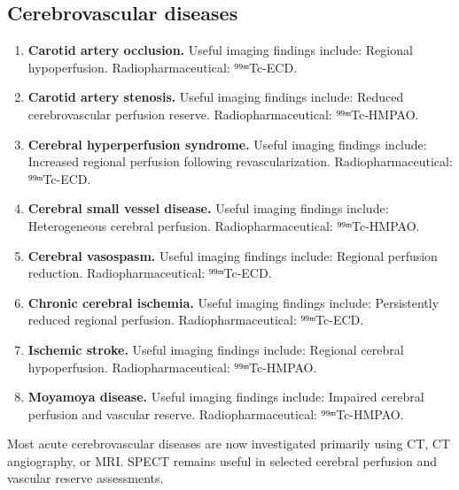 \subsection{Cerebrovascular diseases}
\begin{enumerate}[leftmargin=*,itemsep=0.45em,topsep=0.4em]
\item \textbf{Carotid artery occlusion.} Useful imaging findings include: Regional hypoperfusion. Radiopharmaceutical: ⁹⁹ᵐTc-ECD.
\item \textbf{Carotid artery stenosis.} Useful imaging findings include: Reduced cerebrovascular perfusion reserve. Radiopharmaceutical: ⁹⁹ᵐTc-HMPAO.
\item \textbf{Cerebral hyperperfusion syndrome.} Useful imaging findings include: Increased regional perfusion following revascularization. Radiopharmaceutical: ⁹⁹ᵐTc-ECD.
\item \textbf{Cerebral small vessel disease.} Useful imaging findings include: Heterogeneous cerebral perfusion. Radiopharmaceutical: ⁹⁹ᵐTc-HMPAO.
\item \textbf{Cerebral vasospasm.} Useful imaging findings include: Regional perfusion reduction. Radiopharmaceutical: ⁹⁹ᵐTc-ECD.
\item \textbf{Chronic cerebral ischemia.} Useful imaging findings include: Persistently reduced regional perfusion. Radiopharmaceutical: ⁹⁹ᵐTc-ECD.
\item \textbf{Ischemic stroke.} Useful imaging findings include: Regional cerebral hypoperfusion. Radiopharmaceutical: ⁹⁹ᵐTc-HMPAO.
\item \textbf{Moyamoya disease.} Useful imaging findings include: Impaired cerebral perfusion and vascular reserve. Radiopharmaceutical: ⁹⁹ᵐTc-HMPAO.
\end{enumerate}
Most acute cerebrovascular diseases are now investigated primarily using CT, CT angiography, or MRI. SPECT remains useful in selected cerebral perfusion and vascular reserve assessments.

